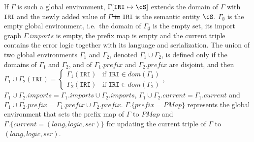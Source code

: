 \documentclass[10pt,fleqn,final]{scrreprt}
\newcommand*{\syntax}[1]{\texttt{#1}}
\newcommand{\semdom}[1]{
\begin{center}
\fbox{$#1$}
\end{center}
}
\newcommand{\prefix}{\mathit{prefix}}
\newcommand{\current}{\mathit{current}}
\newcommand{\PMap}{\mathit{PMap}}
\newenvironment{definitions}[0]{\medskip }{}
\providecommand{\DIFadd}[1]{{\protect\color{blue}\uwave{#1}}} %
\providecommand{\DIFdel}[1]{{\protect\color{red}\sout{#1}}}                      %
\providecommand{\DIFaddbegin}{} %
\providecommand{\DIFaddend}{} %
\providecommand{\DIFdelbegin}{} %
\providecommand{\DIFdelend}{} %
\begin{document}
\begin{definitions}
If $\Gamma$ is such a global environment, $\Gamma[\syntax{IRI} \mapsto \cS]$
extends the domain of $\Gamma$ with \syntax{IRI} and
the newly added value of \DIFdelbegin \DIFdel{$\Gamma$ in }\DIFdelend \syntax{IRI} \DIFaddbegin \DIFadd{in $\Gamma$ }\DIFaddend is the semantic entity $\cS$.
 $\Gamma_\emptyset$ is the empty global environment, i.e.~the domain of $\Gamma_\emptyset$ is the empty set, its import graph $\Gamma.imports$ is empty,
the prefix map is empty and the current triple contains the error logic together with its language and serialization.
The union of two global environments $\Gamma_1$ and $\Gamma_2$, 
denoted $\Gamma_1\cup\Gamma_2$, is defined only if the domains of $\Gamma_1$ and $\Gamma_2$,
and of $\Gamma_1.\prefix$ and $\Gamma_2.\prefix$ are disjoint, and then
$\Gamma_1\cup\Gamma_2(\syntax{IRI}) = \begin{cases}
\Gamma_1(\syntax{IRI})& \mbox{if } \syntax{IRI} \in dom(\Gamma_1) \\
\Gamma_2(\syntax{IRI})& \mbox{if } \syntax{IRI} \in dom(\Gamma_2)
\end{cases}$, 
$\Gamma_1\cup\Gamma_2.imports = \Gamma_1.imports \cup \Gamma_2.imports$,
$\Gamma_1\cup\Gamma_2.\current = \Gamma_1.\current$
and $\Gamma_1\cup\Gamma_2.\prefix = \Gamma_1.\prefix \cup \Gamma_2.\prefix$.
  $\Gamma.\{\prefix = \PMap\}$ represents the global environment that sets the prefix map of 
$\Gamma$ to $\PMap$ and $\Gamma.\{\current  = (lang, logic, ser)\}$ \DIFaddbegin \DIFadd{is used }\DIFaddend for 
updating the current triple of $\Gamma$ to $(lang, logic, ser)$.



%


\end{definitions}
\end{document}
